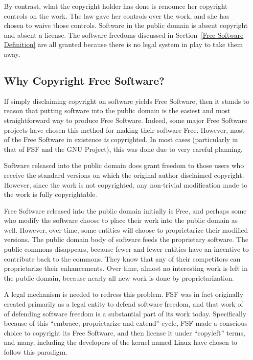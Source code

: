 \documentclass[12pt]{report}
\begin{document}
By contrast, what the copyright holder has done is renounce her copyright
controls on the work.  The law gave her controls over the work, and she
has chosen to waive those controls.  Software in the public domain is
absent copyright and absent a license.  The software freedoms discussed in
Section~\ref{Free Software Definition} are all granted because there is no
legal system in play to take them away.

\subsection{Why Copyright Free Software?}

If simply disclaiming copyright on software yields Free Software, then it
stands to reason that putting software into the public domain is the
easiest and most straightforward way to produce Free Software.  Indeed,
some major Free Software projects have chosen this method for making their
software Free.  However, most of the Free Software in existence \emph{is}
copyrighted.  In most cases (particularly in that of FSF and the GNU
Project), this was done due to very careful planning.

Software released into the public domain does grant freedom to those users
who receive the standard versions on which the original author disclaimed
copyright.  However, since the work is not copyrighted, any non-trivial
modification made to the work is fully copyrightable.

Free Software released into the public domain initially is Free, and
perhaps some who modify the software choose to place their work into the
public domain as well.  However, over time, some entities will choose to
proprietarize their modified versions.  The public domain body of software
feeds the proprietary software.  The public commons disappears, because
fewer and fewer entities have an incentive to contribute back to the
commons.  They know that any of their competitors can proprietarize their
enhancements.  Over time, almost no interesting work is left in the public
domain, because nearly all new work is done by proprietarization.

A legal mechanism is needed to redress this problem.  FSF was in fact
originally created primarily as a legal entity to defend software freedom,
and that work of of defending software freedom is a substantial part of
its work today.  Specifically because of this ``embrace, proprietarize and
extend'' cycle, FSF made a conscious choice to copyright its Free Software,
and then license it under ``copyleft'' terms, and many, including the
developers of the kernel named Linux have chosen to follow this paradigm.
\end{document}
